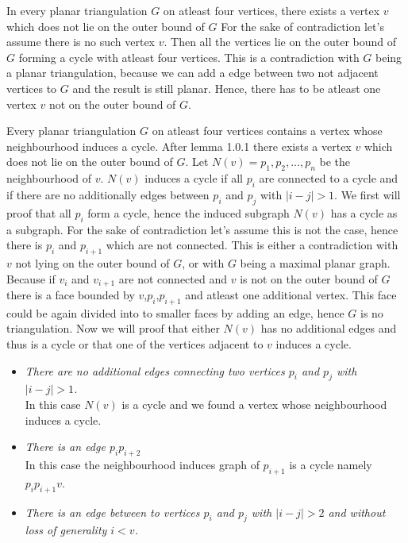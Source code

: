 \documentclass[a4paper]{article}
\begin{document}
	\begin{solution}{21}
		\begin{lemma}{In every planar triangulation $G$ on atleast four vertices, there exists a vertex $v$ which does not lie on the outer bound of $G$}
		For the sake of contradiction let's assume there is no such vertex $v$. 
		Then all the vertices lie on the outer bound of $G$ forming a cycle with atleast four vertices. 
		This is a contradiction with $G$ being a planar triangulation, because we can add a edge between two not adjacent vertices to $G$ and the result is still planar. 
		Hence, there has to be atleast one vertex $v$ not on the outer bound of $G$. 
		\end{lemma}
	
		\begin{theorem}{Every planar triangulation $G$ on atleast four vertices contains a vertex whose neighbourhood induces a cycle.}
		After lemma 1.0.1 there exists a vertex $v$ which does not lie on the outer bound of $G$. 
		Let $N(v) = {p_1,p_2,...,p_n}$ be the neighbourhood of $v$. 
		$N(v)$ induces a cycle if all $p_i$ are connected to a cycle and if there are no additionally edges between $p_i$ and $p_j$ with $|i-j|>1$.  
		We first will proof that all $p_i$ form a cycle, hence the induced subgraph $N(v)$ has a cycle as a subgraph. 
		For the sake of contradiction let's assume this is not the case, hence there is $p_i$ and $p_{i+1}$ which are not connected. 
		This is either a contradiction with $v$ not lying on the outer bound of $G$, or with $G$ being a maximal planar graph. 
		Because if $v_i$ and $v_{i+1}$ are not connected and $v$ is not on the outer bound of $G$ there is a face bounded by $v$,$p_i$,$p_{i+1}$ and atleast one additional vertex. 
		This face could be again divided into to smaller faces by adding an edge, hence $G$ is no triangulation. 
		Now we will proof that either $N(v)$ has no additional edges and thus is a cycle or that one of the vertices adjacent to $v$ induces a cycle. 
		\begin{itemize}
			\item \emph{There are no additional edges connecting two vertices $p_i$ and $p_j$ with $|i-j|>1$.} \\
				In this case $N(v)$ is a cycle and we found a vertex whose neighbourhood induces a cycle.
			\item \emph{There is an edge $p_ip_{i+2}$}\\
				In this case the neighbourhood induces graph of $p_{i+1}$ is a cycle namely $p_i p_{i+1} v$. 
			\item \emph{There is an edge between to vertices $p_i$ and $p_j$ with $|i-j| > 2$  and without loss of generality $i<v$.}\\

\end{itemize}
\end{theorem}
\end{solution}
\end{document}
